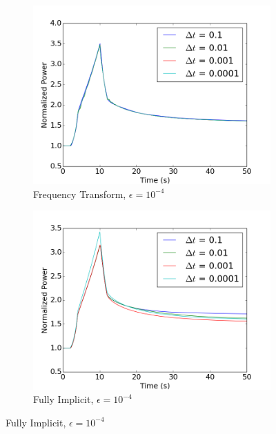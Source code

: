 \documentclass[12pt]{report}
\begin{document}
\begin{figure}[ht]
			\begin{subfigure}{.5\textwidth}
				\centering
				\includegraphics[width=.95\linewidth]{figs/power_case1_conv2.png}
				\caption{Frequency Transform, $\epsilon = 10^{-4}$}
				\label{fig::power_1_2_ft}
			\end{subfigure}%
			\begin{subfigure}{.5\textwidth}
				\centering
				\includegraphics[width=.95\linewidth]{figs/power_case1_conv2_omega0.png}
				\caption{Fully Implicit, $\epsilon = 10^{-4}$}
				\label{fig::power_1_2_fi}
			\end{subfigure}


\end{figure}
\end{document}
